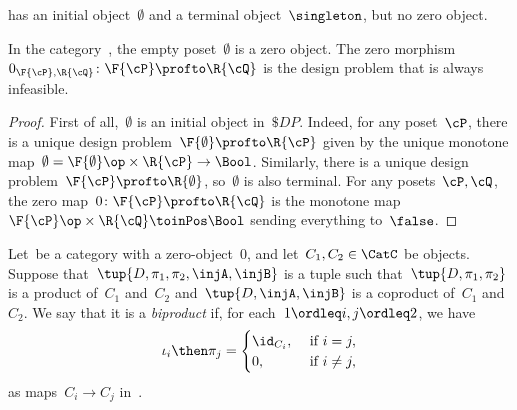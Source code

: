 \begin{example}
    \Pos has an initial object~$\emptyset$ and a terminal object~$\singleton$, but no zero object.
\end{example}

\begin{lemma}
    In the category~\DP, the empty poset~$\emptyset$ is a zero object. The zero morphism~$0_{\F{\cP},\R{\cQ}}\colon \F{\cP} \profto \R{\cQ}$ is the design problem that is always infeasible.
\end{lemma}
\begin{proof}
    First of all,~$\emptyset$ is an initial object in~$\$DP$. Indeed, for any poset~$\cP $, there is a unique design problem~$\F{\emptyset} \profto \R{\cP}$ given by the unique monotone map~$\emptyset=\F{\emptyset}\op\times \R{\cP} \to\Bool$. Similarly, there is a unique design problem~$\F{\cP} \profto \R{\emptyset}$, so~$\emptyset$ is also terminal. For any posets~$\cP ,\cQ$, the zero map~$0 \colon \F{\cP} \profto \R{\cQ}$ is the monotone map~$\F{\cP} \op\times \R{\cQ} \toinPos \Bool$ sending everything to~$\false$.
\end{proof}

\begin{ctdefinition}[Biproduct]
    Let~\CatC be a category with a zero-object~$0$, and let~$C_1,C_2\in\CatC$ be objects. Suppose that~$\tup{D,\pi_1,\pi_2,\injA,\injB}$ is a tuple such that~$\tup{D,\pi_1,\pi_2}$ is a product of~$C_1$ and~$C_2$ and~$\tup{D,\injA,\injB}$ is a coproduct of~$C_1$ and~$C_2$. We say that it is a \emph{biproduct} if, for each~$1\ordleq i,j\ordleq 2$, we have
    \begin{equation}
        \iota_i\then \pi_j=
        \begin{cases}
            \id_{C_i}, &\text{ if }i=j,\\
            0, &\text{ if }i\neq j,
        \end{cases} \label{eq:biproduct-condition}
    \end{equation}
    as maps~$C_i\to C_j$ in~\CatC.
\end{ctdefinition}

